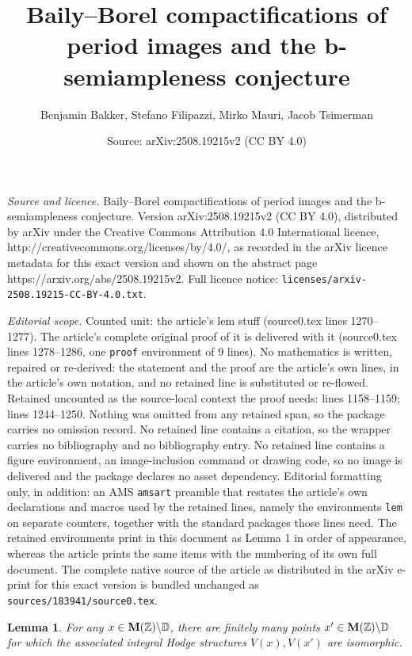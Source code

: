 \documentclass[10pt,a4paper]{amsart}
\title{Baily--Borel compactifications of period images and the b-semiampleness conjecture}
\author{Benjamin Bakker, Stefano Filipazzi, Mirko Mauri, Jacob Tsimerman}
\date{Source: arXiv:2508.19215v2 (CC BY 4.0)}
\newtheorem{lem}{Lemma}
\def\bD{\mathbb{D}}
\def\bZ{\mathbb{Z}}
\newcommand\bfM{{\bf M}}
\begin{document}
\maketitle

\noindent\emph{Source and licence.} Baily--Borel compactifications of period images and the b-semiampleness conjecture. Version arXiv:2508.19215v2 (CC BY 4.0), distributed by arXiv under the Creative Commons Attribution 4.0 International licence, http://creativecommons.org/licenses/by/4.0/, as recorded in the arXiv licence metadata for this exact version and shown on the abstract page https://arxiv.org/abs/2508.19215v2. Full licence notice: \texttt{licenses/arxiv-2508.19215-CC-BY-4.0.txt}.\par\smallskip

\noindent\textit{Editorial scope.} Counted unit: the article's lem stuff (source0.tex lines 1270--1277). The article's complete original proof of it is delivered with it (source0.tex lines 1278--1286, one \texttt{proof} environment of 9 lines). No mathematics is written, repaired or re-derived: the statement and the proof are the article's own lines, in the article's own notation, and no retained line is substituted or re-flowed.  Retained uncounted as the source-local context the proof needs: lines 1158--1159; lines 1244--1250.  Nothing was omitted from any retained span, so the package carries no omission record.  No retained line contains a citation, so the wrapper carries no bibliography and no bibliography entry.  No retained line contains a figure environment, an image-inclusion command or drawing code, so no image is delivered and the package declares no asset dependency.  Editorial formatting only, in addition: an AMS \texttt{amsart} preamble that restates the article's own declarations and macros used by the retained lines, namely the environments \texttt{lem} on separate counters, together with the standard packages those lines need.  The retained environments print in this document as Lemma 1 in order of appearance, whereas the article prints the same items with the numbering of its own full document.  The complete native source of the article as distributed in the arXiv e-print for this exact version is bundled unchanged as \texttt{sources/183941/source0.tex}.
    \begin{lem}\label{lem:unpol orbit}For any $x\in \bfM(\bZ)\backslash \bD$, there are finitely many points $x'\in \bfM(\bZ)\backslash \bD$ for which the associated integral Hodge structures $V(x),V(x')$ are isomorphic.
\end{lem}
\end{document}
